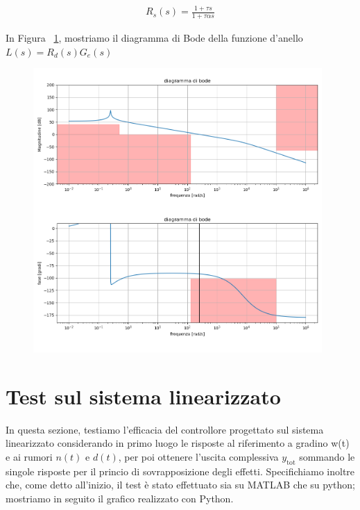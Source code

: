 \documentclass[a4paper, 11pt]{article}
\begin{document}
\begin{align}\label{eq:R_s}
R_s(s)=\frac{1+\tau s}{1+\tau\alpha s}
\end{align}

In Figura ~\ref{Figura4}, mostriamo il diagramma di Bode della funzione d'anello $L(s) = R_d(s) G_e(s)$
\begin{figure}[H]
    \centering
\includegraphics[width=110mm]{figs/bode_L.png}
    \caption{}
    \label{Figura4}
\end{figure}
\section{Test sul sistema linearizzato}

In questa sezione, testiamo l'efficacia del controllore progettato sul sistema linearizzato considerando in primo luogo le risposte al riferimento a gradino w(t) e ai rumori $n(t)$ e $d(t)$, per poi ottenere l'uscita complessiva $y_{\text{tot}}$ sommando le singole risposte per il princio di sovrapposizione degli effetti. Specifichiamo inoltre che, come detto all'inizio, il test è stato effettuato sia su MATLAB che su python; mostriamo in seguito il grafico realizzato con Python.
\end{document}
